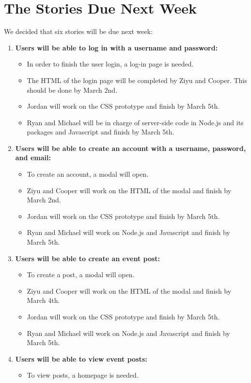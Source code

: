 \documentclass[a4paper]{article}
\begin{document}
\section{The Stories Due Next Week}
We decided that six stories will be due next week:
\begin{enumerate}
\item \textbf{Users will be able to log in with a username and password:}
\begin{itemize}
\item In order to finish the user login, a log-in page is needed. 
\item The HTML of the login page will be completed by Ziyu and Cooper. This should be done by March 2nd.
\item Jordan will work on the CSS prototype and finish by March 5th. 
\item Ryan and Michael will be in charge of server-side code in Node.js and its packages and Javascript and finish by March 5th.
\end{itemize}
\item \textbf{Users will be able to create an account with a username, password, and email:}
\begin{itemize}
\item To create an account, a modal will open.
\item Ziyu and Cooper will work on the HTML of the modal and finish by March 2nd.
\item Jordan will work on the CSS prototype and finish by March 5th.
\item Ryan and Michael will work on Node.js and Javascript and finish by March 5th.
\end{itemize}
\item \textbf{Users will be able to create an event post:}
\begin{itemize}
\item To create a post, a modal will open.
\item Ziyu and Cooper will work on the HTML of the modal and finish by March 4th.
\item Jordan will work on the CSS prototype and finish by March 5th.
\item Ryan and Michael will work on Node.js and Javascript and finish by March 5th.
\end{itemize}
\item \textbf{Users will be able to view event posts:}
\begin{itemize}
\item To view posts, a homepage is needed.

\end{itemize}
\end{enumerate}
\end{document}
